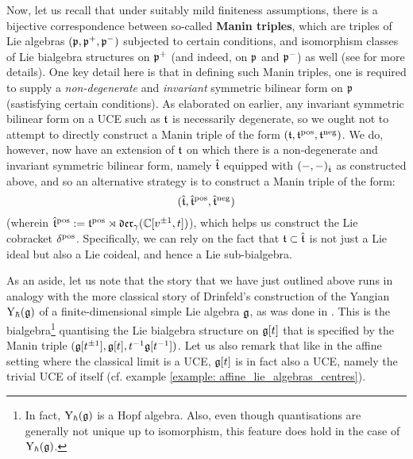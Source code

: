         Now, let us recall that under suitably mild finiteness assumptions, there is a bijective correspondence between so-called \textbf{Manin triples}, which are triples of Lie algebras $(\mathfrak{p}, \mathfrak{p}^+, \mathfrak{p}^-)$ subjected to certain conditions, and isomorphism classes of Lie bialgebra structures on $\mathfrak{p}^+$ (and indeed, on $\mathfrak{p}$ and $\mathfrak{p}^-$) as well (see \cite{etingof_kazhdan_quantisation_1} for more details). One key detail here is that in defining such Manin triples, one is required to supply a \textit{non-degenerate} and \textit{invariant} symmetric bilinear form on $\mathfrak{p}$ (sastisfying certain conditions). As elaborated on earlier, any invariant symmetric bilinear form on a UCE such as $\mathfrak{t}$ is necessarily degenerate, so we ought not to attempt to directly construct a Manin triple of the form $(\mathfrak{t}, \mathfrak{t}^{\mathrm{pos}}, \mathfrak{t}^{\mathrm{neg}})$. We do, however, now have an extension of $\mathfrak{t}$ on which there is a non-degenerate and invariant symmetric bilinear form, namely $\hat{\mathfrak{t}}$ equipped with $(-, -)_{\hat{\mathfrak{t}}}$ as constructed above, and so an alternative strategy is to construct a Manin triple of the form:
            $$(\hat{\mathfrak{t}}, \hat{\mathfrak{t}}^{\mathrm{pos}}, \hat{\mathfrak{t}}^{\mathrm{neg}})$$
        (wherein $\hat{\mathfrak{t}}^{\mathrm{pos}} := \mathfrak{t}^{\mathrm{pos}} \rtimes \mathfrak{der}_{\gamma}(\mathbb{C}[v^{\pm 1}, t])$), which helps us construct the Lie cobracket $\delta^{\mathrm{pos}}$. Specifically, we can rely on the fact that $\mathfrak{t} \subset \hat{\mathfrak{t}}$ is not just a Lie ideal but also a Lie coideal, and hence a Lie sub-bialgebra. 

        As an aside, let us note that the story that we have just outlined above runs in analogy with the more classical story of Drinfeld's construction of the Yangian $\mathrm{Y}_{\hbar}(\mathfrak{g})$ of a finite-dimensional simple Lie algebra $\mathfrak{g}$, as was done in \cite{drinfeld_original_yangian_paper}. This is the bialgebra\footnote{In fact, $\mathrm{Y}_{\hbar}(\mathfrak{g})$ is a Hopf algebra. Also, even though quantisations are generally not unique up to isomorphism, this feature does hold in the case of $\mathrm{Y}_{\hbar}(\mathfrak{g})$.} quantising the Lie bialgebra structure on $\mathfrak{g}[t]$ that is specified by the Manin triple $(\mathfrak{g}[t^{\pm 1}], \mathfrak{g}[t], t^{-1}\mathfrak{g}[t^{-1}])$. Let us also remark that like in the affine setting where the classical limit is a UCE, $\mathfrak{g}[t]$ is in fact also a UCE, namely the trivial UCE of itself (cf. example \ref{example: affine_lie_algebras_centres}).

